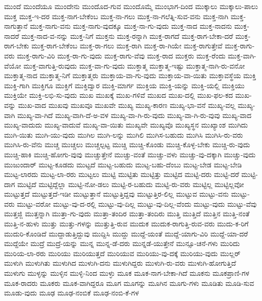 {ಮುಂದೆ
ಮುಂದೆಯೂ
ಮುಂದೇನು
ಮುಂದೊದ-ಗುವ
ಮುಂದೊಮ್ಮೆ
ಮುಂಭಾಗ-ದಿಂದ
ಮುಕ್ಕಾಲು
ಮುಕ್ಕಾಲು-ಪಾಲು
ಮುಕ್ತ
ಮುಕ್ತ-ಇ-ದರ
ಮುಕ್ತ-ನಾಗ-ಬೇಕೆಂಬ
ಮುಕ್ತ-ನಾ-ಗಲು
ಮುಕ್ತ-ನಾ-ಗಲೆತ್ನಿ-ಸುವ-ವನು
ಮುಕ್ತ-ನಾಗಿ
ಮುಕ್ತ-ನಾಗುತ್ತಾನೆ
ಮುಕ್ತ-ನಾಗು-ವನು
ಮುಕ್ತ-ನಾಗು-ವುದಕ್ಕೂ
ಮುಕ್ತ-ನಾ-ಗು-ವುದು
ಮುಕ್ತ-ನಾದ
ಮುಕ್ತ-ನಾದನು
ಮುಕ್ತ-ನಾದರೆ
ಮುಕ್ತ-ನಾದ-ವ-ನನ್ನು
ಮುಕ್ತ-ನಿಗೆ
ಮುಕ್ತನು
ಮುಕ್ತ-ರನ್ನಾಗಿ
ಮುಕ್ತ-ರಾಗದೆ
ಮುಕ್ತ-ರಾಗ-ಬೇಕಾ-ದರೆ
ಮುಕ್ತ-ರಾಗ-ಬೇಕು
ಮುಕ್ತ-ರಾಗ-ಬೇಕೆಂಬ
ಮುಕ್ತ-ರಾ-ಗಲು
ಮುಕ್ತ-ರಾಗಿ
ಮುಕ್ತ-ರಾ-ಗಿಯೇ
ಮುಕ್ತ-ರಾಗುತ್ತೇವೆ
ಮುಕ್ತ-ರಾಗು-ವರು
ಮುಕ್ತ-ರಾಗು-ವಿರಿ
ಮುಕ್ತ-ರಾ-ಗು-ವುದು
ಮುಕ್ತ-ರಾಗು-ವೆವು
ಮುಕ್ತ-ರಾದ
ಮುಕ್ತರು
ಮುಕ್ತ-ರೆಂದು
ಮುಕ್ತ-ವಾಗಿ-ವೆಯೋ
ಮುಕ್ತ-ವಾಗುತ್ತಿ-ರುವುದು
ಮುಕ್ತ-ವಾ-ಗು-ವುದು
ಮುಕ್ತಾತ್ಮ
ಮುಕ್ತಾತ್ಮ-ಇಷ್ಟು
ಮುಕ್ತಾತ್ಮ-ನಾಗಿ-ರು-ವನೋ
ಮುಕ್ತಾತ್ಮ-ನಾದ
ಮುಕ್ತಾತ್ಮ-ನಿಗೆ
ಮುಕ್ತಾತ್ಮರು
ಮುಕ್ತಾಯ-ವಾ-ಗು-ವುದು
ಮುಕ್ತಾಯ-ವಾ-ಯಿತು
ಮುಕ್ತಾವಸ್ಥೆಯ
ಮುಕ್ತಿ
ಮುಕ್ತಿ-ಗಾಗಿ
ಮುಕ್ತಿಗೂ
ಮುಕ್ತಿಗೆ
ಮುಕ್ತಿದ್ವಾರ
ಮುಕ್ತಿ-ಮಾರ್ಗ
ಮುಕ್ತಿಯ
ಮುಕ್ತಿ-ಯನ್ನು
ಮುಕ್ತಿ-ಯಲ್ಲಿ
ಮುಕ್ತಿಯು
ಮುಕ್ತಿಯೇ
ಮುಕ್ತಿ-ಲಭಿ-ಸು-ವುದು
ಮುಖ
ಮುಖಕ್ಕೆ
ಮುಖ-ಗಳಿವೆ
ಮುಖದ
ಮುಖ-ದಲ್ಲಿ
ಮುಖ-ಫಲ-ಕದ
ಮುಖ-ವನ್ನು
ಮುಖ-ವಾದ
ಮುಖವು
ಮುಖವೂ
ಮುಖವೇ
ಮುಖ್ಯ
ಮುಖ್ಯ-ಕಾರಣ
ಮುಖ್ಯ-ಭಾ-ವನೆ
ಮುಖ್ಯ-ವಲ್ಲ
ಮುಖ್ಯ-ವಾಗಿ
ಮುಖ್ಯ-ವಾ-ಗಿದೆ
ಮುಖ್ಯ-ವಾಗಿ-ದೆ-ಅ-ವಳ
ಮುಖ್ಯ-ವಾ-ಗಿ-ರು-ವುದು
ಮುಖ್ಯ-ವಾ-ಗಿ-ರು-ವುವು
ಮುಖ್ಯ-ವಾದ
ಮುಖ್ಯ-ವಾದುದು
ಮುಖ್ಯ-ವಾದುವೆ
ಮುಖ್ಯ-ವಾ-ಯಿತು
ಮುಖ್ಯವೇ
ಮುಖ್ಯವೊ
ಮುಖ್ಯಸ್ಥನ
ಮುಖ್ಯಾಂಶ
ಮುಗಿದು
ಮುಗಿ-ಯಿತು
ಮುಗಿ-ಯು-ವುದು
ಮುಗಿಲ
ಮುಗಿ-ಲನ್ನು
ಮುಗಿಲಿ
ಮುಗಿಸ-ಬಹುದು
ಮುಗಿಸಿ
ಮುಗಿಸಿ-ರು-ವರು
ಮುಗಿಸಿ-ರು-ವೆನು
ಮುಚ್ಚ
ಮುಚ್ಚಲು
ಮುಚ್ಚಲ್ಪಟ್ಟ
ಮುಚ್ಚಿ
ಮುಚ್ಚಿ-ಕೊಂಡು
ಮುಚ್ಚಿ-ಕೊಳ್ಳ-ಬೇಕು
ಮುಚ್ಚಿ-ರು-ವುದು
ಮುಚ್ಚಿ-ಹಾಕಿ
ಮುಚ್ಚಿ-ಹೋಗು-ವುವು
ಮುಚ್ಚುತ್ತೇನೆ
ಮುಚ್ಚು-ವಂತೆ
ಮುಚ್ಚು-ವಳು
ಮುಚ್ಚು-ವು-ದಕ್ಕಾಗಿ
ಮುಚ್ಚು-ವುದು
ಮುಜುಂದಾರ್
ಮುಟ್ಟ-ಕೂಡದು
ಮುಟ್ಟದೆ
ಮುಟ್ಟ-ಬಹುದು
ಮುಟ್ಟ-ಬಹು-ದೆಂಬು
ಮುಟ್ಟ-ಬೇಡ
ಮುಟ್ಟ-ಬೇಡಿ
ಮುಟ್ಟ-ಲಾರದು
ಮುಟ್ಟ-ಲಾ-ರರು
ಮುಟ್ಟಲು
ಮುಟ್ಟಿ
ಮುಟ್ಟಿತು
ಮುಟ್ಟಿತ್ತು
ಮುಟ್ಟಿದ
ಮುಟ್ಟಿ-ದರು
ಮುಟ್ಟಿ-ದರೆ
ಮುಟ್ಟಿ-ದಾಗ
ಮುಟ್ಟಿದೆ
ಮುಟ್ಟಿದ್ದೆಲ್ಲಾ
ಮುಟ್ಟಿ-ನೋ-ಡಲು
ಮುಟ್ಟಿ-ರ-ಬಹುದು
ಮುಟ್ಟಿ-ರು-ವರು
ಮುಟ್ಟಿಲ್ಲ
ಮುಟ್ಟಿಲ್ಲವೋ
ಮುಟ್ಟುತ್ತದೆ
ಮುಟ್ಟುತ್ತದೆ-ಇಡೀ
ಮುಟ್ಟುತ್ತಾನೆ
ಮುಟ್ಟುತ್ತಿದ್ದವು
ಮುಟ್ಟುತ್ತಿರ-ಲಿಲ್ಲ
ಮುಟ್ಟುವ
ಮುಟ್ಟು-ವನು
ಮುಟ್ಟು-ವರು
ಮುಟ್ಟು-ವರೋ
ಮುಟ್ಟು-ವು-ದ-ರಲ್ಲಿ
ಮುಟ್ಟು-ವು-ದಿಲ್ಲ
ಮುಟ್ಟು-ವು-ದಿಲ್ಲ-ವೆಂದು
ಮುಟ್ಟು-ವುದು
ಮುಟ್ಟು-ವೆವು
ಮುತ್ತಜ್ಜಿ
ಮುತ್ತನ್ನಾಗಿ
ಮುತ್ತಾ-ಗು-ವುದು
ಮುತ್ತಾ-ತಂದಿರ
ಮುತ್ತಾ-ತಂದಿರು
ಮುತ್ತಿ
ಮುತ್ತಿದೆ
ಮುತ್ತಿನ
ಮುತ್ತಿ-ನಂತೆ
ಮುತ್ತಿ-ನ-ಹುಳು
ಮುತ್ತು
ಮುತ್ತು-ಗಳನ್ನು
ಮುತ್ತುತ್ತಿ-ರುವ
ಮುದುಕ
ಮುದುಕ-ರಾಗುತ್ತಿ-ರುವ-ವರು
ಮುದು-ಕ-ರಿಗೆ
ಮುದುರಿ-ಕೊಂಡಿದೆ
ಮುದ್ದಾಡುತ್ತಿದ್ದುವು
ಮುದ್ದಿಸಿ
ಮುದ್ದು
ಮುದ್ದೆ-ಯಂತೆ
ಮುದ್ದೆ-ಯಾಗು-ವಿರಿ
ಮುದ್ದೆ-ಯಾ-ದರೆ
ಮುದ್ದೆಯೇ
ಮುದ್ರೆ
ಮುದ್ರೆ-ಯನ್ನು
ಮುನ್ನ
ಮುನ್ನ-ಡೆ-ದರು
ಮುನ್ನಡೆ-ಯುತ್ತೇನೆ
ಮುನ್ಸೂ-ಚನೆ-ಗಳು
ಮುರಿದು
ಮುರಿಯ-ಲಾ-ರರು
ಮುರಿಯು
ಮುರಿಯುತ್ತದೆ
ಮುರಿಯುವ
ಮುರಿಯು-ವು-ದಕ್ಕೆ
ಮುರಿಯು-ವುದು
ಮುಲ್ಲರ್
ಮುಳುಗಿ
ಮುಳುಗಿತು
ಮುಳುಗಿದ
ಮುಳುಗಿ-ದನು
ಮುಳುಗಿದ್ದರು
ಮುಳುಗಿ-ರು-ವರು
ಮುಳುಗಿ-ಹೋಗುತ್ತಿದೆ
ಮುಳುಗು
ಮುಳ್ಳನ್ನು
ಮುಳ್ಳಿನ
ಮುಳ್ಳಿ-ನಿಂದ
ಮುಳ್ಳು
ಮೂಕ
ಮೂಕ-ನಾಗ-ಬೇಕಾ-ಗಿದೆ
ಮೂಕನು
ಮೂಕಪ್ರಾಣಿ-ಗಳ
ಮೂಕ-ರಾದರು
ಮೂಕರು
ಮೂಕ-ವಾಗಿದ್ದರೂ
ಮೂಗ
ಮೂಗನ್ನು
ಮೂಗಿನ
ಮೂಗು-ಗಳು
ಮೂಡಿತು
ಮೂಡಿ-ಸುವ
ಮೂಡು-ವುದು
ಮೂಢ
ಮೂಢ-ನಂಬಿಕೆ
ಮೂಢ-ನಂಬಿ-ಕೆ-ಗಳ
}
